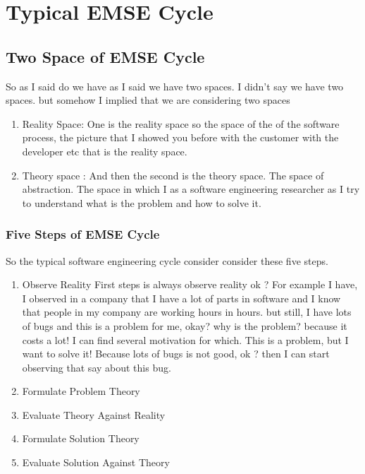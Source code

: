 \documentclass[conference, compsoc, twoside]{IEEEtran}
\begin{document}
\section{Typical EMSE Cycle} %

\subsection{Two Space of EMSE Cycle} %
 So as I said do we have as I said we have two spaces. I didn't say we have two spaces. but somehow I implied that we are considering two spaces 
 \begin{enumerate}
 	\item Reality Space: One is the reality space so the space of the of the software process, the picture that I showed you before with the customer with the developer etc that is the reality space.
 	\item Theory space : And then the second is the theory space. The space of abstraction. 
 	The space in which I as a software engineering researcher as I try to understand what is the problem and how to solve it. 
 \end{enumerate}
\subsubsection{Five Steps of EMSE Cycle} %
\label{sub:five_steps_of_emse_cycle}
So the typical software engineering cycle consider consider these five steps.
\begin{enumerate}
	\item Observe Reality
	First steps is always observe reality ok ?  For example I have, I observed in a company that I have a lot of parts in software and I know that people in my company are working hours in hours.
	but still, I have lots of bugs and this is a problem for me, okay? 
	why is the problem? because it costs a lot! I can find several motivation for which. 
	This is a problem, but I want to solve it! 
	Because lots of bugs is not good, ok ? then I can start observing that say about this bug.

	\item Formulate Problem Theory
	\item Evaluate Theory Against Reality
	\item Formulate Solution Theory
	\item Evaluate Solution Against Theory
	

\end{enumerate}
\end{document}
